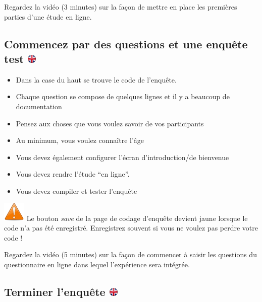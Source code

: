 \documentclass[
]{book}
\providecommand{\tightlist}{%
  \setlength{\itemsep}{0pt}\setlength{\parskip}{0pt}}
\begin{document}
Regardez la vidéo (3 minutes) sur la façon de mettre en place les
premières parties d'une étude en ligne.

\hypertarget{commencez-par-des-questions-et-une-enquuxeate-test}{%
\subsection[Commencez par des questions et une enquête test
]{\texorpdfstring{Commencez par des questions et une enquête test
\href{https://www.psytoolkit.org/lessons/project.html\#_start_with_questions_and_test_survey}{\protect\includegraphics{img/ukflag.png}}}{Commencez par des questions et une enquête test }}\label{commencez-par-des-questions-et-une-enquuxeate-test}}

\begin{itemize}
\tightlist
\item
  Dans la case du haut se trouve le code de l'enquête.
\item
  Chaque question se compose de quelques lignes et il y a beaucoup de
  documentation
\item
  Pensez aux choses que vous voulez savoir de vos participants
\item
  Au minimum, vous voulez connaître l'âge
\item
  Vous devez également configurer l'écran d'introduction/de bienvenue
\item
  Vous devez rendre l'étude ``en ligne''.
\item
  Vous devez compiler et tester l'enquête
\end{itemize}

\includegraphics{img/attention.png} Le bouton \emph{save} de la page de
codage d'enquête devient jaune lorsque le code n'a pas été enregistré.
{Enregistrez souvent si vous ne voulez pas perdre votre code !}

Regardez la vidéo (5 minutes) sur la façon de commencer à saisir les
questions du questionnaire en ligne dans lequel l'expérience sera
intégrée.

\hypertarget{terminer-lenquuxeate}{%
\subsection[Terminer l'enquête ]{\texorpdfstring{Terminer l'enquête
\href{https://www.psytoolkit.org/lessons/project.html\#_finish_survey}{\protect\includegraphics{img/ukflag.png}}}{Terminer l'enquête }}\label{terminer-lenquuxeate}}
\end{document}
